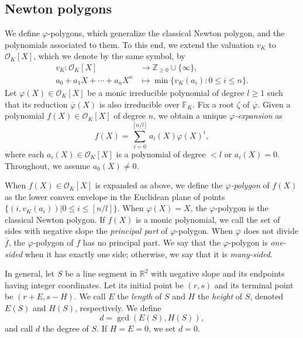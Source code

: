 \documentclass[10pt,a4paper]{amsart}
\newcommand{\field}[1]{\mathbb{#1}}
\newcommand{\Z}{\field{Z}}
\newcommand{\R}{\field{R}}
\numberwithin{equation}{section}
\begin{document}
  \subsection{Newton polygons}\label{sec:Newton polygons}
    
    We define $\varphi$-polygons, which generalize the classical Newton polygon, and the polynomials associated to them. 
    To this end, we extend the valuation $v_K$ to $\mathcal{O}_K[X]$, which we denote by the same symbol, by 
    \begin{align}
      v_K:\mathcal{O}_K[X] & \rightarrow \Z_{\ge 0} \cup \{ \infty \}, \\
      a_0 + a_1 X + \cdots + a_n X^n & \mapsto \min\{v_K(a_i):0 \le i \le n \}. 
    \end{align}
    Let $\varphi(X) \in \mathcal{O}_K[X]$ be a monic irreducible polynomial of degree $l \ge 1$ such that 
    its reduction $\overline{\varphi}(X)$ is also irreducible over $\field{F}_K$. 
    Fix a root $\zeta$ of $\overline{\varphi}$. 
    Given a polynomial $f(X) \in \mathcal{O}_K[X]$ of degree $n$, we obtain a unique \emph{$\varphi$-expansion} as 
    \[
      f(X) = \sum_{i = 0}^{[n/l]} a_i(X) \varphi(X)^i, 
    \]
    where each $a_i(X) \in \mathcal{O}_K[X]$ is a polynomial of degree $< l$ or $a_i(X)=0$. 
    Throughout, we assume $a_0(X) \ne 0$. 

    When $f(X) \in \mathcal{O}_K[X]$ is expanded as above, we define the \emph{$\varphi$-polygon} of $f(X)$ 
    as the lower convex envelope in the Euclidean plane of points $\{(i,v_K(a_i))|0 \le i \le [n/l]\}$. 
    When $\varphi(X) = X$, the $\varphi$-polygon is the classical Newton polygon. 
    If $f(X)$ is a monic polynomial, we call the set of sides with negative slope the \emph{principal part} of $\varphi$-polygon. 
    When $\overline{\varphi}$ does not divide $\overline{f}$, the $\varphi$-polygon of $f$ has no principal part. 
    We say that the $\varphi$-polygon is \emph{one-sided} when it has exactly one side; otherwise, we say that it is \emph{many-sided}. 

    In general, let $S$  be a line segment in $\R^2$ with negative slope and its endpoints
    having integer coordinates. 
    Let its initial point be $(r,s)$ and its terminal point be $(r + E,s - H)$. 
    We call $E$ the \emph{length} of $S$ and $H$ the \emph{height} of $S$, denoted $E(S)$ and $H(S)$, respectively. 
    We define 
    \[
      d = \gcd(E(S),H(S)), 
    \]
    and call $d$ the degree of $S$. If $H = E = 0$, we set $d = 0$. 
\end{document}
